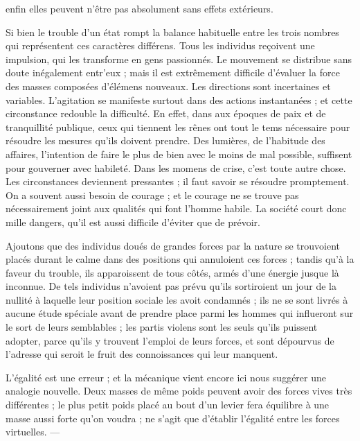 \documentclass[11pt,a4paper]{article}
\begin{document}
enfin elles peuvent n'être pas absolument sans effets extérieurs.

Si bien le trouble d'un état rompt la balance habituelle entre les trois
nombres qui représentent ces caractères différens. Tous les individus
reçoivent une impulsion, qui les transforme en gens passionnés. Le mouvement
se distribue sans doute inégalement entr'eux ; mais il est extrêmement
difficile d'évaluer la force des masses composées d'élémens nouveaux. Les
directions sont incertaines et variables. L'agitation se manifeste surtout
dans des actions instantanées ; et cette circonstance 
redouble la difficulté. En effet, dans aux époques de paix et de tranquillité
publique, ceux qui tiennent les rênes ont tout le tems nécessaire pour
résoudre les mesures qu'ils doivent prendre. Des lumières, de l'habitude des
affaires, l'intention de faire le plus de bien avec le moins de mal
possible, suffisent pour gouverner avec habileté. Dans les momens de crise,
c'est toute autre chose. Les circonstances deviennent pressantes ; il faut
savoir se résoudre promptement. On a souvent aussi besoin de courage ; et le
courage ne se trouve pas nécessairement joint aux qualités qui
 font l'homme habile. La société court donc mille
dangers, qu'il est aussi difficile d'éviter que de prévoir.

Ajoutons  que des individus doués de grandes forces par
la nature se trouvoient placés durant le calme dans des positions qui
annuloient ces forces ; tandis qu'à la faveur du trouble, ils apparoissent de
tous côtés, armés d'une énergie jusque là inconnue. De tels individus
n'avoient pas prévu qu'ils sortiroient un jour de la nullité à laquelle leur
position sociale les avoit condamnés ; ils ne se sont livrés à aucune étude
spéciale avant de prendre place parmi les hommes qui influeront sur le sort
de leurs semblables ; les partis violens sont les seuls qu'ils puissent
adopter, parce qu'ils y trouvent l'emploi de leurs forces, et
 sont
dépourvus de l'adresse qui seroit le fruit des connoissances qui leur
manquent.

L'égalité est une erreur ; et la mécanique vient encore ici nous suggérer
une analogie nouvelle. Deux masses de même poids peuvent avoir des forces
vives très différentes ; le plus petit poids placé au bout d'un levier fera
équilibre à une masse aussi forte qu'on voudra ;  ne s'agit que
d'établir l'égalité entre les forces virtuelles. ---
\end{document}
